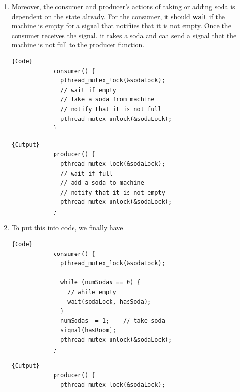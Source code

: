 \documentclass{article}
\begin{document}
\begin{example}
\begin{enumerate}
\begin{minipage}{.49\linewidth}
\begin{lstlisting}[]{Output}
              pthread_mutex_unlock(&sodaLock); 
            }
          \end{lstlisting}
          \end{minipage}

        \item Moreover, the consumer and producer's actions of taking or adding soda is dependent on the state already. For the consumer, it should \textbf{wait} if the machine is empty for a signal that notifiies that it is not empty. Once the consumer receives the signal, it takes a soda and can send a signal that the machine is not full to the producer function. 

          \noindent\begin{minipage}{.5\linewidth}
          \begin{lstlisting}[]{Code}
            consumer() {
              pthread_mutex_lock(&sodaLock); 
              // wait if empty
              // take a soda from machine
              // notify that it is not full 
              pthread_mutex_unlock(&sodaLock); 
            }
          \end{lstlisting}
          \end{minipage}
          \hfill
          \begin{minipage}{.49\linewidth}
          \begin{lstlisting}[]{Output}
            producer() {
              pthread_mutex_lock(&sodaLock); 
              // wait if full 
              // add a soda to machine
              // notify that it is not empty 
              pthread_mutex_unlock(&sodaLock); 
            }
          \end{lstlisting}
          \end{minipage}

        \item To put this into code, we finally have 

          \noindent\begin{minipage}{.5\linewidth}
          \begin{lstlisting}[]{Code}
            consumer() {
              pthread_mutex_lock(&sodaLock); 

              while (numSodas == 0) {   
                // while empty 
                wait(sodaLock, hasSoda); 
              }
              numSodas -= 1;    // take soda 
              signal(hasRoom); 
              pthread_mutex_unlock(&sodaLock); 
            }
          \end{lstlisting}
          \end{minipage}
          \hfill
          \begin{minipage}{.49\linewidth}
          \begin{lstlisting}[]{Output}
            producer() {
              pthread_mutex_lock(&sodaLock); 


\end{lstlisting}
\end{minipage}
\end{enumerate}
\end{example}
\end{document}
